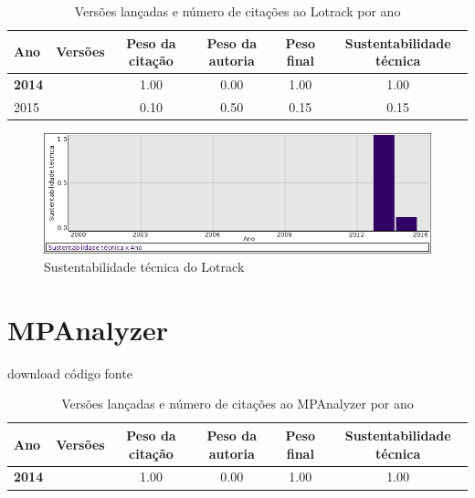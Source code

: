 \begin{table}[H]
\caption{Versões lançadas e número de citações ao Lotrack por ano}
\centering
\begin{tabular}{| l | c | c | c | c | c |}
  \hline
  Ano & Versões & Peso da citação & Peso da autoria & Peso final & Sustentabilidade técnica \\
  \hline
            {\bf 2014}
          &
          
          &
          1.00
          &
          0.00
          &
          1.00
          &
            {\color{blue} 1.00}
          \\
\hline
            2015
          &
          
          &
          0.10
          &
          0.50
          &
          0.15
          &
            {\color{red} 0.15}
          \\
\hline
\end{tabular}
\end{table}

\begin{figure}[h]
  \center
  \includegraphics[scale=0.50]{imagens/softwares-charts/lotrack.png}
  \caption{Sustentabilidade técnica do Lotrack}
\end{figure}


\section{MPAnalyzer}
\checkmark download
\checkmark código fonte


\begin{table}[H]
\caption{Versões lançadas e número de citações ao MPAnalyzer por ano}
\centering
\begin{tabular}{| l | c | c | c | c | c |}
  \hline
  Ano & Versões & Peso da citação & Peso da autoria & Peso final & Sustentabilidade técnica \\
  \hline
            {\bf 2014}
          &
          
          &
          1.00
          &
          0.00
          &
          1.00
          &
            {\color{blue} 1.00}
          \\
\hline
\end{tabular}
\end{table}

